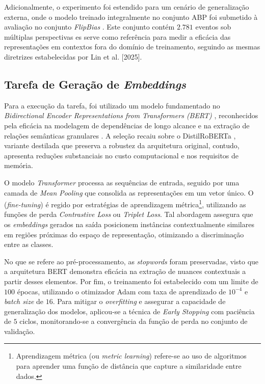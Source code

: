 Adicionalmente, o experimento foi estendido para um cenário de generalização externa, onde o modelo treinado integralmente no conjunto ABP foi submetido à 
avaliação no conjunto \textit{FlipBias} \cite{chen2018learning}. Este conjunto contém $2.781$ eventos sob múltiplas perspectivas es serve como referência para medir a eficácia das
representações em contextos fora do domínio de treinamento, seguindo as mesmas diretrizes estabelecidas por Lin et al. [2025]. 

\subsection{Tarefa de Geração de \textit{Embeddings}}\label{sec:representacoes}

Para a execução da tarefa, foi utilizado um modelo fundamentado no \textit{Bidirectional Encoder Representations from Transformers (BERT)} \cite{bert}, 
reconhecidos pela eficácia na modelagem de dependências de longo alcance e na extração de relações semânticas granulares \cite{Zhang}. 
A seleção recaiu sobre o DistilRoBERTa \cite{roberta}, variante destilada que preserva a robustez da arquitetura original, 
contudo, apresenta reduções substanciais no custo computacional e nos requisitos de memória.

O modelo \textit{Transformer} processa as sequências de entrada, seguido por uma camada de \textit{Mean Pooling} que consolida 
as representações em um vetor único. O (\textit{fine-tuning}) é regido por estratégias de aprendizagem métrica\footnote{Aprendizagem métrica (ou \textit{metric learning}) refere-se ao uso de algoritmos para aprender uma função de distância que capture a similaridade entre dados.}, 
utilizando as funções de perda \textit{Contrastive Loss} ou \textit{Triplet Loss}. Tal abordagem assegura que os \textit{embeddings} gerados na saída 
posicionem instâncias contextualmente similares em regiões próximas do espaço de representação, otimizando a discriminação entre as classes.

No que se refere ao pré-processamento, as \textit{stopwords} foram preservadas, visto que a arquitetura BERT demonstra eficácia na extração de nuances contextuais 
a partir desses elementos. Por fim, o treinamento foi estabelecido com um limite de $100$ épocas, utilizando o otimizador Adam com 
taxa de aprendizado de $10^{-4}$ e \textit{batch size} de $16$. Para mitigar o \textit{overfitting} e assegurar a capacidade de 
generalização dos modelos, aplicou-se a técnica de \textit{Early Stopping} com paciência de $5$ ciclos, monitorando-se a 
convergência da função de perda no conjunto de validação.

